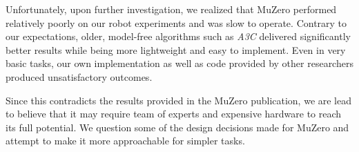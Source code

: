 Unfortunately, upon further investigation, we realized that MuZero performed relatively poorly on our robot experiments and was slow to operate. Contrary to our expectations, older, model-free algorithms such as \textit{A3C} \cite{a3c} delivered significantly better results while being more lightweight and easy to implement. Even in very basic tasks, our own implementation as well as code provided by other researchers produced unsatisfactory outcomes.

Since this contradicts the results provided in the MuZero publication, we are lead to believe that it may require team of experts and expensive hardware to reach its full potential. We question some of the design decisions made for MuZero and attempt to make it more approachable for simpler tasks.